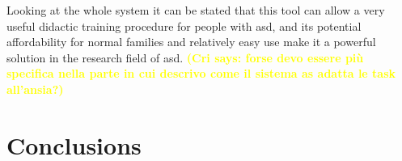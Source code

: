 \documentclass[12pt,journal,draftclsnofoot,onecolumn]{IEEEtran}
\newcommand{\cri}[1]{\textcolor{yellow}{\textbf{(Cri says: #1)}}}
\begin{document}
Looking at the whole system it can be stated that this tool can allow a very useful didactic training procedure for people with \gls{asd}, and its potential affordability for normal families and relatively easy use make it a powerful solution in the research field  of \gls{asd}. \cri{forse devo essere più specifica nella parte in cui descrivo come il sistema as adatta le task all'ansia?}





















\section{Conclusions}\label{sec:conclusions}



\end{document}
